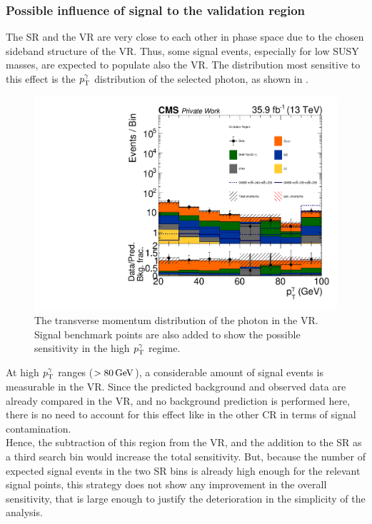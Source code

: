 \subsubsection*{Possible influence of signal to the validation region}
The SR and the VR are very close to each other in phase space due to the chosen sideband structure of the VR. Thus, some signal events, especially for low SUSY masses, are expected to populate also the VR. The distribution most sensitive to this effect is the $p_{\mathrm{T}}^{\gamma}$ distribution of the selected photon, as shown in .
\begin{figure}[tbp]
 \centering
 \includegraphics[width=\pairwidth]{figures/VR_signal_study/VR_LL_pt_g1_log}
 \caption{The transverse momentum distribution of the photon in the VR. Signal benchmark points are also added to show the possible sensitivity in the high $p_{\mathrm{T}}^{\gamma}$ regime.}
 \label{fig:signalContVR}
\end{figure}
At high $p_{\mathrm{T}}^{\gamma}$ ranges ($>80\,\text{Ge\hspace{-.08em}V}$), a considerable amount of signal events is measurable in the VR. Since the predicted background and observed data are already compared in the VR, and no background prediction is performed here, there is no need to account for this effect like in the other CR in terms of signal contamination.\\
Hence, the subtraction of this region from the VR, and the addition to the SR as a third search bin would increase the total sensitivity. But, because the number of expected signal events in the two SR bins is  already high enough for the relevant signal points, this strategy does not show any improvement in the overall sensitivity, that is large enough to justify the deterioration in the simplicity of the analysis.

